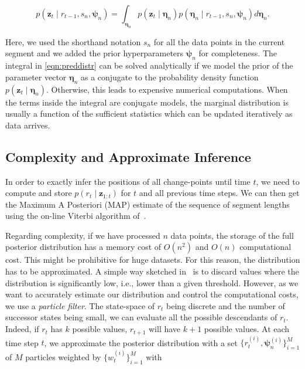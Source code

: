 \begin{equation}
\label{eqn:preddistr}
p(\mathbf{z}_t\mid r_{t-1},s_n,\boldsymbol{\psi}_n)=
\int_{\boldsymbol{\eta}_{n}}p(\mathbf{z}_t\mid \boldsymbol{\eta}_{n})
p(\boldsymbol{\eta}_{n}\mid r_{t-1},s_n,\boldsymbol{\psi}_n)
d\boldsymbol{\eta}_{n}.
\end{equation}

Here, we used the shorthand notation $s_n$ for all the data points in the
current segment and we added the prior hyperparameters $\boldsymbol{\psi}_{n}$
for completeness. The integral in \eqref{eqn:preddistr} can be solved
analytically if we model the prior of the parameter vector
$\boldsymbol{\eta}_{n}$ as a conjugate to the probability density function
$p(\mathbf{z}_t\mid \boldsymbol{\eta}_{n})$. Otherwise, this leads to expensive
numerical computations. When the terms inside the integral are conjugate models,
the marginal distribution is usually a function of the sufficient statistics
which can be updated iteratively as data arrives.

\subsection{Complexity and Approximate Inference}
In order to exactly infer the positions of all change-points until time $t$, we
need to compute and store $p(r_t\mid \mathbf{z}_{1:t})$ for $t$ and all previous
time steps. We can then get the Maximum A Posteriori (MAP) estimate of the
sequence of segment lengths using the on-line Viterbi
algorithm of~\cite{fearnhead07online}.

Regarding complexity, if we have processed $n$ data points, the storage of the
full posterior distribution has a memory cost of $O(n^2)$ and $O(n)$
computational cost. This might be prohibitive for huge datasets. For this
reason, the distribution has to be approximated. A simple way sketched
in~\cite{adams07bayesian} is to discard values where the distribution is
significantly low, i.e., lower than a given threshold. However, as we want to
accurately estimate our distribution and control the computational costs, we use
a \emph{particle filter}. The state-space of $r_t$ being discrete and the number
of successor states being small, we can evaluate all the possible descendants of
$r_t$. Indeed, if $r_t$ has $k$ possible values, $r_{t+1}$ will have $k+1$
possible values. At each time step $t$, we approximate the posterior
distribution with a set $\{r_t^{(i)},\boldsymbol{\psi}_{n}^{(i)}\}_{i=1}^M$ of
$M$ particles weighted by $\{w_t^{(i)}\}_{i=1}^M$ with

